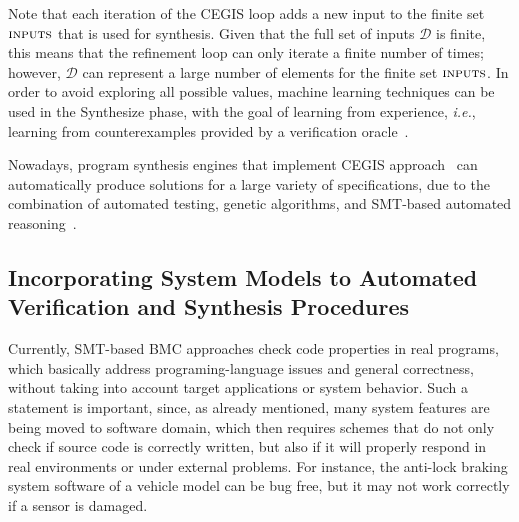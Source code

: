 \documentclass{acm_sen_article}
\begin{document}
Note that each iteration of the CEGIS loop adds a new input to the finite set $\text{\sc inputs}$ that is used for synthesis.  Given that the full set of inputs $\mathcal{D}$ is finite, this means that the refinement loop can only iterate a finite number of times; however, $\mathcal{D}$ can represent a large number of elements for the finite set $\text{\sc inputs}$. In order to avoid exploring all possible values, machine learning techniques can be used in the {\sc Synthesize} phase, with the goal of learning from experience, {\it i.e.}, learning from counterexamples provided by a verification oracle~\cite{Alur13}.

Nowadays, program synthesis engines that implement CEGIS approach~\cite{sketch} can automatically produce solutions for a large variety of specifications, due to the combination of automated testing, genetic algorithms, and SMT-based automated reasoning~\cite{Sharma14}.

\subsection{Incorporating System Models to Automated \\ Verification and Synthesis Procedures}

Currently, SMT-based BMC approaches check code properties in real programs, which basically address programing-language issues and general correctness, without taking into account target applications or system behavior. Such a statement is important, since, as already mentioned, many system features are being moved to software domain, which then requires schemes that do not only check if source code is correctly written, but also if it will properly respond in real environments or under external problems. For instance, the anti-lock braking system software of a vehicle model can be bug free, but it may not work correctly if a sensor is damaged.
\end{document}
